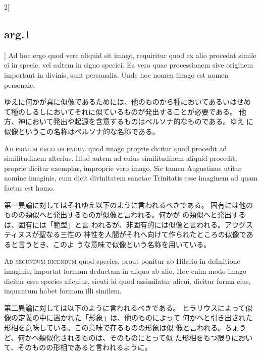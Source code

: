 \documentclass[paper=a4paper,fontsize=10pt,jafontsize=9pt,titlepage]{jlreq}
\begin{document}
\begin{paracol}{2}[\subsection{arg.1}]
Ad hoc ergo quod vere aliquid sit imago, requiritur quod ex
alio procedat simile ei in specie, vel saltem in signo speciei. Ea
vero quae processionem sive originem important in divinis, sunt
personalia. Unde hoc nomen imago est nomen personale.

\switchcolumn

ゆえに何かが真に似像であるためには、他のものから種においてあるいはせめ
 て種のしるしにおいてそれに似ているものが発出することが必要である。
他方、神において発出や起源を含意するものはペルソナ的なものである。ゆえ
 に似像というこの名称はペルソナ的な名称である。

\switchcolumn*[\subsection{ad.1}]

{\scshape Ad primum ergo dicendum} quod imago proprie dicitur quod procedit ad
similitudinem alterius. Illud autem ad cuius similitudinem aliquid
procedit, proprie dicitur exemplar, improprie vero imago. Sic tamen
Augustinus utitur nomine imaginis, cum dicit divinitatem sanctae
Trinitatis esse imaginem ad quam factus est homo.

\switchcolumn

第一異論に対してはそれゆえ以下のように言われるべきである。
固有には他のものの類似へと発出するものが似像と言われる。何かが
 の類似へと発出するは、固有には「範型」と言
 われるが、非固有的には似像と言われる。アウグスティヌスが聖なる三性の
 神性を人間がそれへ向けて作られたところの似像であると言うとき、このよ
 うな意味で似像という名称を用いている。

\switchcolumn*[\subsection{ad.2}]

{\scshape Ad secundum dicendum} quod species, prout ponitur ab Hilario in
definitione imaginis, importat formam deductam in aliquo ab alio. Hoc
enim modo imago dicitur esse species alicuius, sicuti id quod
assimilatur alicui, dicitur forma eius, inquantum habet formam illi
similem.

\switchcolumn

第二異論に対しては以下のように言われるべきである。
ヒラリウスによって似像の定義の中に置かれた「形象」は、他のものによって
 何かへと引き出された形相を意味している。この意味で在るものの形象は似
 像と言われる。ちょうど、何かへ類似化されるものは、そのものにとって似
 た形相をもつ限りにおいて、そのものの形相であると言われるように。


\end{paracol}
\end{document}
